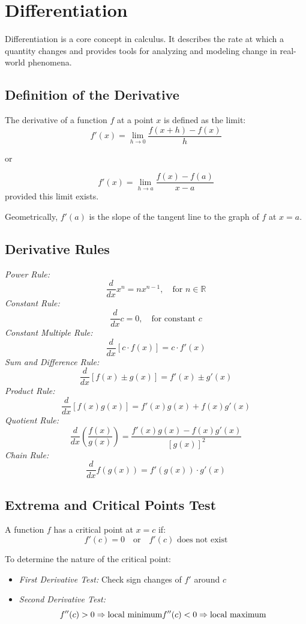 \newpage
\section{Differentiation}

Differentiation is a core concept in calculus. It describes the rate at which a quantity changes and provides tools for analyzing and modeling change in real-world phenomena.

\subsection{Definition of the Derivative}

The derivative of a function \(f\) at a point \(x\) is defined as the limit:
\[
f'(x) = \lim_{h \to 0} \frac{f(x + h) - f(x)}{h}
\]

or

\[f'(x) = \lim_{h \to a}\frac{f(x) - f(a)}{x - a}\]
provided this limit exists.

Geometrically, \(f'(a)\) is the slope of the tangent line to the graph of \(f\) at \(x = a\).

\subsection{Derivative Rules}

\emph{Power Rule:}
\[
\frac{d}{dx} x^n = nx^{n - 1}, \quad \text{for } n \in \mathbb{R}
\]
\emph{Constant Rule:}
\[
\frac{d}{dx} c = 0, \quad \text{for constant } c
\]
\emph{Constant Multiple Rule:}
\[
\frac{d}{dx} [c \cdot f(x)] = c \cdot f'(x)
\]
\emph{Sum and Difference Rule:}
\[
\frac{d}{dx} [f(x) \pm g(x)] = f'(x) \pm g'(x)
\]
\emph{Product Rule:}
\[
\frac{d}{dx} [f(x)g(x)] = f'(x)g(x) + f(x)g'(x)
\]
\emph{Quotient Rule:}
\[
\frac{d}{dx} \left( \frac{f(x)}{g(x)} \right) = \frac{f'(x)g(x) - f(x)g'(x)}{[g(x)]^2}
\]
\emph{Chain Rule:}
\[
\frac{d}{dx} f(g(x)) = f'(g(x)) \cdot g'(x)
\]

\subsection{Extrema and Critical Points Test}

A function \(f\) has a critical point at \(x = c\) if:
\[
f'(c) = 0 \quad \text{or} \quad f'(c) \text{ does not exist}
\]

To determine the nature of the critical point:
\begin{itemize}[label=\(-\)]
\item \emph{First Derivative Test:} Check sign changes of \(f'\) around \(c\)
\item \emph{Second Derivative Test:}
\[
f''(c) > 0 \Rightarrow \text{local minimum} \\
f''(c) < 0 \Rightarrow \text{local maximum}
\]
\end{itemize}

